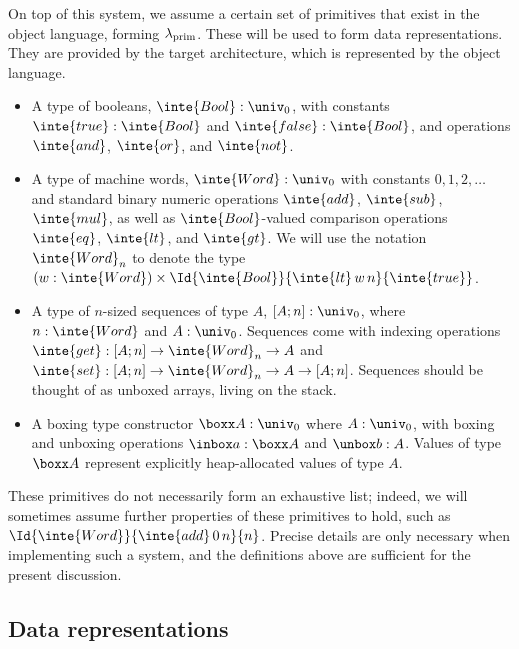 On top of this system, we assume a certain set of primitives that exist in the
object language, forming $\lambda_{\text{prim}}$. These will be used to form data
representations. They are provided by the target architecture, which is
represented by the object language.
\begin{itemize}
  \item A type of booleans, $\inte{Bool} : \univ_0$, with constants $\inte{true} :
          \inte{Bool}$ and $\inte{false} : \inte{Bool}$, and operations $\inte{and}$,
        $\inte{or}$, and $\inte{not}$.
  \item A type of machine words, $\inte{Word} : \univ_0$ with constants $0, 1, 2,
          \ldots$ and standard binary numeric operations $\inte{add}$, $\inte{sub}$,
        $\inte{mul}$, as well as $\inte{Bool}$-valued comparison operations
        $\inte{eq}$, $\inte{lt}$, and $\inte{gt}$. We will use the notation
        $\inte{Word}_n$ to denote the type $(w : \inte{Word}) \times
          \Id{\inte{Bool}}{\inte{lt} \, w \, n}{\inte{true}}$.
  \item A type of $n$-sized sequences of type $A$, $\seq{A}{n} : \univ_0$, where $n :
          \inte{Word}$ and $A : \univ_0$. Sequences come with indexing operations
        $\inte{get} : \seq{A}{n} \to \inte{Word}_n \to A$ and $\inte{set} : \seq{A}{n}
          \to \inte{Word}_n \to A \to \seq{A}{n}$. Sequences should be thought of as
        unboxed arrays, living on the stack.
  \item A boxing type constructor $\boxx A : \univ_0$ where $A : \univ_0$, with boxing
        and unboxing operations $\inbox a : \boxx A$ and $\unbox b : A$. Values of type
        $\boxx A$ represent explicitly heap-allocated values of type $A$.
\end{itemize}
These primitives do not necessarily form an exhaustive list; indeed, we will sometimes assume
further properties of these primitives to hold, such as $\Id{\inte{Word}}{\inte{add}\,0\,n}{n}$.
Precise details are only necessary when implementing such a system, and the definitions above
are sufficient for the present discussion.

\subsection{Data representations}


